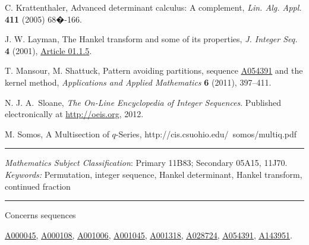 \documentclass[12pt,reqno]{article}
\theoremstyle{definition}
\newcommand{\seqnum}[1]{\href{http://oeis.org/#1}{\underline{#1}}}
\begin{document}
\begin{thebibliography}{13}

C. Krattenthaler, Advanced determinant calculus: A
complement, \emph{Lin. Alg. Appl.} {\bf 411} (2005)
68�-166.

 J. W. Layman,
 The Hankel transform and some
    of
    its properties, \emph{J. Integer Seq.} {\bf
    4} (2001), \href{http://www.cs.uwaterloo.ca/journals/JIS/VOL4/LAYMAN/hankel.html}{Article 01.1.5}.

T. Mansour, M. Shattuck, Pattern avoiding partitions, sequence \seqnum{A054391} and the kernel method, \emph{Applications and Applied Mathematics} \textbf{6} (2011), 397--411.

 N. J. A.~Sloane, \emph{The
On-Line Encyclopedia of Integer Sequences}. Published electronically
at \href{http://oeis.org}{http://oeis.org}, 2012.

M. Somos, A Multisection of $q$-Series, http://cis.csuohio.edu/~somos/multiq.pdf

\end{thebibliography}

\bigskip \hrule \bigskip 

 {\it Mathematics Subject Classification}: Primary 11B83; Secondary 05A15, 11J70. 
\\
\noindent \emph{Keywords:}
Permutation, integer sequence, Hankel determinant, Hankel
transform, continued fraction

 \bigskip \hrule \bigskip \noindent Concerns sequences  


\seqnum{A000045},
\seqnum{A000108},
\seqnum{A001006},
\seqnum{A001045},
\seqnum{A001318},
\seqnum{A028724},
\seqnum{A054391},
\seqnum{A143951}.
\end{document}
